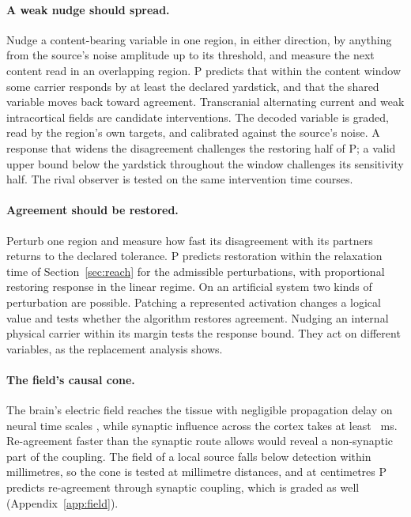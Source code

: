 \documentclass[12pt]{article}
\begin{document}
\paragraph{A weak nudge should spread.} Nudge a content-bearing variable in one
region, in either direction, by anything from the source's noise amplitude up
to its threshold, and measure the next content read in an overlapping region.
P predicts that within the content window some carrier responds by at least
the declared yardstick, and that the shared variable moves back toward
agreement. Transcranial alternating current and weak intracortical fields are
candidate interventions. The decoded variable is graded, read by the region's
own targets, and calibrated against the source's noise. A response that widens
the disagreement challenges the restoring half of P; a valid upper bound below
the yardstick throughout the window challenges its sensitivity half. The rival
observer is tested on the same intervention time courses.

\paragraph{Agreement should be restored.} Perturb one region and measure how
fast its disagreement with its partners returns to the declared tolerance.
P predicts restoration within the relaxation time of Section~\ref{sec:reach}
for the admissible perturbations, with proportional restoring response in the
linear regime. On an artificial system two kinds of perturbation are
possible. Patching a represented activation changes a logical value and tests
whether the algorithm restores agreement. Nudging an internal physical carrier
within its margin tests the response bound. They act on different variables,
as the replacement analysis shows.

\paragraph{The field's causal cone.} The brain's electric field reaches the
tissue with negligible propagation delay on neural time scales
\citep{gratiy2017}, while synaptic influence
across the cortex takes at least \ueConeMaxMs{}~ms. Re-agreement faster than the
synaptic route allows would reveal a non-synaptic part of the coupling. The
field of a local source falls below detection within millimetres, so the cone is
tested at millimetre distances, and at centimetres P predicts re-agreement
through synaptic coupling, which is graded as well (Appendix~\ref{app:field}).
\end{document}
